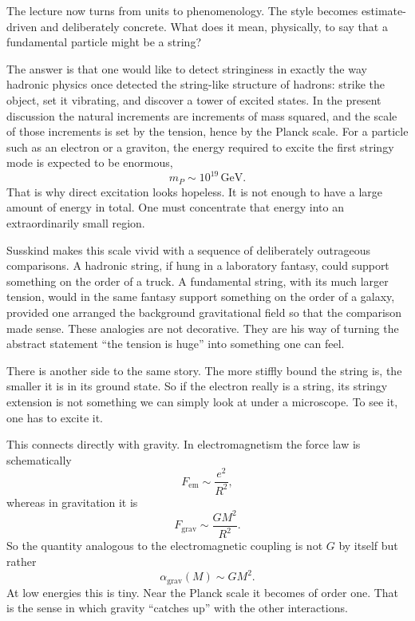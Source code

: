 The lecture now turns from units to phenomenology. The style becomes estimate-driven and deliberately concrete. What does it mean, physically, to say that a fundamental particle might be a string?

The answer is that one would like to detect stringiness in exactly the way hadronic physics once detected the string-like structure of hadrons: strike the object, set it vibrating, and discover a tower of excited states. In the present discussion the natural increments are increments of mass squared, and the scale of those increments is set by the tension, hence by the Planck scale. For a particle such as an electron or a graviton, the energy required to excite the first stringy mode is expected to be enormous,
\begin{equation}
m_{P}\sim 10^{19}\,\mathrm{GeV}.
\end{equation}
That is why direct excitation looks hopeless. It is not enough to have a large amount of energy in total. One must concentrate that energy into an extraordinarily small region.

Susskind makes this scale vivid with a sequence of deliberately outrageous comparisons. A hadronic string, if hung in a laboratory fantasy, could support something on the order of a truck. A fundamental string, with its much larger tension, would in the same fantasy support something on the order of a galaxy, provided one arranged the background gravitational field so that the comparison made sense. These analogies are not decorative. They are his way of turning the abstract statement ``the tension is huge'' into something one can feel.

There is another side to the same story. The more stiffly bound the string is, the smaller it is in its ground state. So if the electron really is a string, its stringy extension is not something we can simply look at under a microscope. To see it, one has to excite it.

This connects directly with gravity. In electromagnetism the force law is schematically
\begin{equation}
F_{\mathrm{em}}\sim \frac{e^{2}}{R^{2}},
\end{equation}
whereas in gravitation it is
\begin{equation}
F_{\mathrm{grav}}\sim \frac{GM^{2}}{R^{2}}.
\end{equation}
So the quantity analogous to the electromagnetic coupling is not \(G\) by itself but rather
\begin{equation}
\alpha_{\mathrm{grav}}(M)\sim GM^{2}.
\end{equation}
At low energies this is tiny. Near the Planck scale it becomes of order one. That is the sense in which gravity ``catches up'' with the other interactions.

